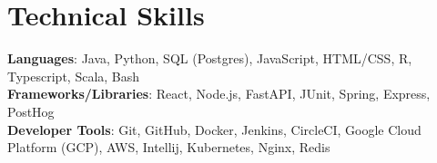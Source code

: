 \documentclass[letterpaper,11pt]{article}
\begin{document}
\section{Technical Skills}
 \begin{itemize}[leftmargin=0.15in, label={}]
    \small{\item{
     \textbf{Languages}{: Java, Python, SQL (Postgres), JavaScript, HTML/CSS, R, Typescript, Scala, Bash} \\
     \textbf{Frameworks/Libraries}{: React, Node.js, FastAPI, JUnit, Spring, Express, PostHog} \\
     \textbf{Developer Tools}{: Git, GitHub, Docker, Jenkins, CircleCI, Google Cloud Platform (GCP), AWS, Intellij, Kubernetes, Nginx, Redis} \\
    }}
 \end{itemize}
\end{document}
